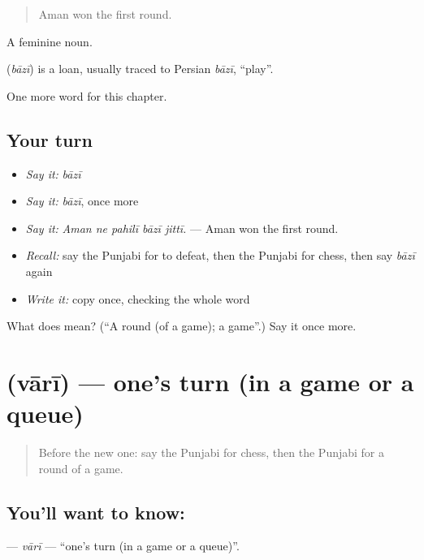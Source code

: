 \begin{quote}
Aman won the first round.
\end{quote}

A feminine noun.

\begin{cousinweb}
\textbf{} (\emph{bāzī}) is a loan, usually traced to Persian \emph{bāzī}, \textquotedblleft{}play\textquotedblright{}.
\end{cousinweb}

\begin{grammarlens}[title={What you've built}]
One more word for this chapter.
\end{grammarlens}

\subsection*{Your turn}
\begin{itemize}
\raggedright
  \item \emph{Say it:} \emph{bāzī}
  \item \emph{Say it:} \emph{bāzī}, once more
  \item \emph{Say it:} \emph{Aman ne pahilī bāzī jittī.} — Aman won the first round.
  \item \emph{Recall:} say the Punjabi for to defeat, then the Punjabi for chess, then say \emph{bāzī} again
  \item \emph{Write it:} copy \textbf{} once, checking the whole word
\end{itemize}

\begin{tcolorbox}[breakable,colback=teal!4,colframe=teal!35!black,title={Before you move on}]
What does  mean? (\textquotedblleft{}A round (of a game); a game\textquotedblright{}.) Say it once more.
\end{tcolorbox}
\section[\texorpdfstring{\pa{ਵਾਰੀ} (vārī)}{ਵਾਰੀ (vārī)}]{ (vārī) — one's turn (in a game or a queue)}

\label{lesson:PA-C352-vari}



\begin{quote}
Before the new one: say the Punjabi for chess, then the Punjabi for a round of a game.
\end{quote}

\subsection*{You'll want to know: }
\textbf{} — \emph{vārī} — \textquotedblleft{}one's turn (in a game or a queue)\textquotedblright{}.

